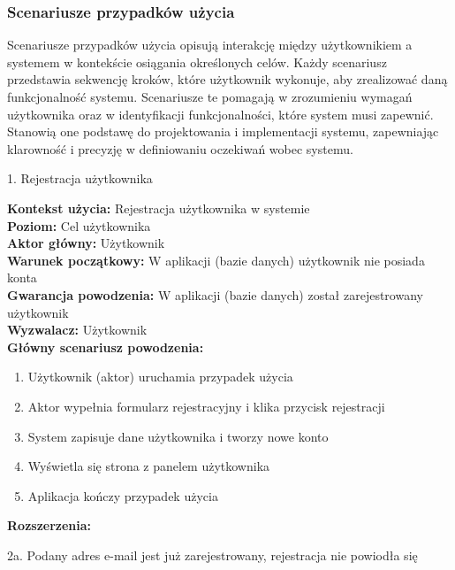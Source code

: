 \subsubsection{Scenariusze przypadków użycia}

Scenariusze przypadków użycia opisują interakcję między użytkownikiem a systemem w kontekście osiągania określonych celów. Każdy scenariusz przedstawia sekwencję kroków, które użytkownik wykonuje, aby zrealizować daną funkcjonalność systemu. Scenariusze te pomagają w zrozumieniu wymagań użytkownika oraz w identyfikacji funkcjonalności, które system musi zapewnić. Stanowią one podstawę do projektowania i implementacji systemu, zapewniając klarowność i precyzję w definiowaniu oczekiwań wobec systemu.
\\

{\noindent \bf{\small 1. Rejestracja użytkownika\par}}
\vspace{0.5cm}
{\noindent \bf Kontekst użycia: } Rejestracja użytkownika w systemie\\
{\bf Poziom: } Cel użytkownika\\
{\bf Aktor główny: } Użytkownik\\
{\bf Warunek początkowy: } W aplikacji (bazie danych) użytkownik nie posiada konta\\
{\bf Gwarancja powodzenia: } W aplikacji (bazie danych) został zarejestrowany użytkownik\\
{\bf Wyzwalacz: } Użytkownik\\
{\bf Główny scenariusz powodzenia: }
\begin{center}
    \begin{enumerate}
        \item Użytkownik (aktor) uruchamia przypadek użycia
        \item Aktor wypełnia formularz rejestracyjny i klika przycisk rejestracji
        \item System zapisuje dane użytkownika i tworzy nowe konto
        \item Wyświetla się strona z panelem użytkownika
        \item Aplikacja kończy przypadek użycia
    \end{enumerate}
\end{center}
{\noindent \bf Rozszerzenia: }
\begin{center}
    \begin{description}
        \item{2a.} Podany adres e-mail jest już zarejestrowany, rejestracja nie powiodła się
    \end{description}
\end{center}

